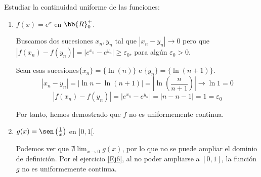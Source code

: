 \begin{ejercicio}
    Estudiar la continuidad uniforme de las funciones:
    \begin{enumerate}
        \item $f(x)=e^x$ en $\bb{R}^+_0$.

        Buscamos dos sucesiones $x_n,y_n$ tal que $|x_n-y_n|\to 0$ pero que $|f(x_n) - f(y_n)| = |e^{x_n} - e^{y_n}| \geq \varepsilon_0$, para algún $\varepsilon_0>0$.
        
        Sean esas sucesiones$\{x_n\} = \{\ln (n)\}$ e $\{y_n\} = \{\ln (n+1)\}$.
        \begin{equation*}
            |x_n-y_n| = |\ln n -\ln(n+1)| = \left| \ln\left( \frac{n}{n+1}\right)\right| \longrightarrow \ln 1 = 0
        \end{equation*}
        \begin{equation*}
            |f(x_n) - f(y_n)| = |e^{x_n} - e^{y_n}| = |n - n -1| = 1 = \varepsilon_0
        \end{equation*}

        Por tanto, hemos demostrado que $f$ no es uniformemente continua.
        
        
        \item $g(x)=\sen \left( \frac{1}{x} \right)$ en $]0,1[$.

        Podemos ver que $\nexists \lim_{x\to 0} g(x)$, por lo que no se puede ampliar el dominio de definición. Por el ejercicio \ref{Ej6}, al no poder ampliarse a $[0,1]$, la función $g$ no es uniformemente continua.
    \end{enumerate}
\end{ejercicio}